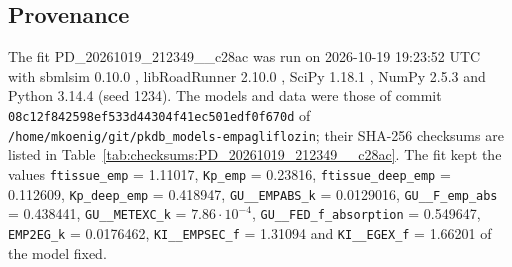 \subsection{Provenance}

The fit PD\_20261019\_212349\_\_c28ac was run on 2026-10-19 19:23:52 UTC with sbmlsim 0.10.0 \cite{Koenig2026_sbmlsim}, libRoadRunner 2.10.0 \cite{Welsh2023}, SciPy 1.18.1 \cite{Virtanen2020}, NumPy 2.5.3 \cite{Harris2020} and Python 3.14.4 (seed 1234). The models and data were those of commit \texttt{08c12f842598ef533d44304f41ec501edf0f670d} of \texttt{/home/mkoenig/git/pkdb\_models-empagliflozin}; their SHA-256 checksums are listed in Table~\ref{tab:checksums:PD_20261019_212349__c28ac}. The fit kept the values \texttt{ftissue\_emp} = 1.11017, \texttt{Kp\_emp} = 0.23816, \texttt{ftissue\_deep\_emp} = 0.112609, \texttt{Kp\_deep\_emp} = 0.418947, \texttt{GU\_\_EMPABS\_k} = 0.0129016, \texttt{GU\_\_F\_emp\_abs} = 0.438441, \texttt{GU\_\_METEXC\_k} = $7.86 \cdot 10^{-4}$, \texttt{GU\_\_FED\_f\_absorption} = 0.549647, \texttt{EMP2EG\_k} = 0.0176462, \texttt{KI\_\_EMPSEC\_f} = 1.31094 and \texttt{KI\_\_EGEX\_f} = 1.66201 of the model fixed.

